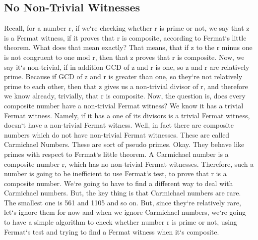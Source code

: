 \subsection{No Non-Trivial Witnesses}
Recall, for a number r, if we`re checking whether r is prime or not, we say that z is a Fermat witness, if it proves that r is composite, according to Fermat`s little theorem.
What does that mean exactly? That means, that if z to the r minus one is not congruent to one mod r, then that z proves that r is composite.
Now, we say it`s non-trivial, if in addition GCD of z and r is one, so z and r are relatively prime.
Because if GCD of z and r is greater than one, so they`re not relatively prime to each other, then that z gives us a non-trivial divisor of r, and therefore we know already, trivially, that r is composite.
Now, the question is, does every composite number have a non-trivial Fermat witness? We know it has a trivial Fermat witness.
Namely, if it has a one of its divisors is a trivial Fermat witness, doesn`t have a non-trivial Fermat witness.
Well, in fact there are composite numbers which do not have non-trivial Fermat witnesses.
These are called Carmichael Numbers.
These are sort of pseudo primes.
Okay.
They behave like primes with respect to Fermat`s little theorem.
A Carmichael number is a composite number r, which has no non-trivial Fermat witnesses.
Therefore, such a number is going to be inefficient to use Fermat`s test, to prove that r is a composite number.
We`re going to have to find a different way to deal with Carmichael numbers.
But, the key thing is that Carmichael numbers are rare.
The smallest one is 561 and 1105 and so on.
But, since they`re relatively rare, let`s ignore them for now and when we ignore Carmichael numbers, we`re going to have a simple algorithm to check whether number r is prime or not, using Fermat`s test and trying to find a Fermat witness when it`s composite.

